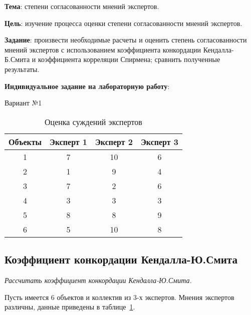


\newcommand{\labnumber}{2} %



\usepackage{systeme}
\usepackage{longtable,tabu}
\usepackage{multirow}
\usepackage{array,multirow}
\usepackage{pdflscape}
\usepackage{afterpage}
\usepackage{bm}

\graphicspath{{../figures/}}


\Russian


\addtocounter{page}{1}

\textbf{Тема}: степени согласованности мнений экспертов.

\textbf{Цель}: изучение процесса оценки степени согласованности мнений экспертов.

\textbf{Задание}: произвести необходимые расчеты и оценить степень согласованности мнений экспертов с использованием коэффициента конкордации Кендалла-Б.Смита и коэффициента корреляции Спирмена; сравнить полученные результаты.

\textbf{Индивидуальное задание на лабораторную работу}:

Вариант №1

\begin{table}[H]
	\caption{Оценка суждений экспертов}
	\label{tab:expert_char}
	\begin{tabular}{|c|c|c|c|}
		\hline
		Объекты & Эксперт 1 & Эксперт 2 & Эксперт 3 \\ \hline
		1       & 7         & 10        & 6         \\ \hline
		2       & 1         & 9         & 4         \\ \hline
		3       & 7         & 2         & 6         \\ \hline
		4       & 3         & 3         & 3         \\ \hline
		5       & 8         & 8         & 9         \\ \hline
		6       & 5         & 10        & 8         \\ \hline
	\end{tabular}
\end{table}

\subsection{Коэффициент конкордации Кендалла-Ю.Смита}
{
	\itshape
	Рассчитать коэффициент конкордации Кендалла-Ю.Смита.
}

Пусть имеется 6 объектов и коллектив из 3-х экспертов.
Мнения экспертов различны, данные приведены в таблице~\ref{tab:expert_char}.

